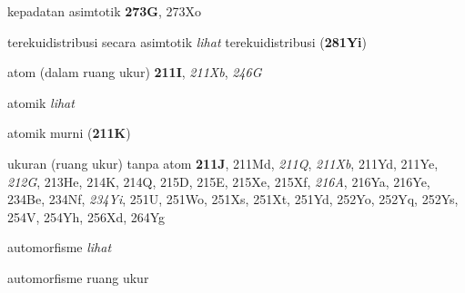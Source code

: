  kepadatan asimtotik {\bf 273G}, 273Xo








 terekuidistribusi secara asimtotik {\it lihat} terekuidistribusi ({\bf 281Yi})






atom (dalam ruang ukur) {\bf 211I}, {\it 211Xb}, {\it 246G}




{atomik {\it lihat}}

atomik murni ({\bf 211K})






ukuran (ruang ukur) tanpa atom {\bf 211J}, 211Md, {\it 211Q}, {\it 211Xb}, 211Yd, 211Ye, {\it 212G}, 213He, 214K, 214Q, 215D, 215E, 215Xe, 215Xf, {\it 216A}, 216Ya, 216Ye, 234Be, 234Nf, {\it 234Yi}, 251U, 251Wo, 251Xs, 251Xt, 251Yd, 252Yo, 252Yq, 252Ys, 254V, 254Yh, 256Xd, 264Yg






















 automorfisme {\it lihat}









automorfisme ruang ukur









